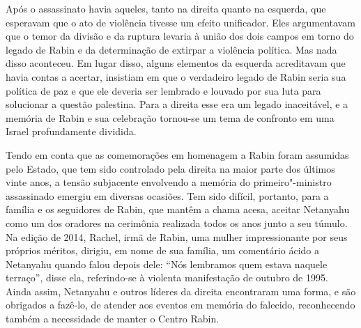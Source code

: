 Após o assassinato havia aqueles, tanto na direita quanto na esquerda,
que esperavam que o ato de violência tivesse um efeito unificador. Eles
argumentavam que o temor da divisão e da ruptura levaria à união dos dois campos
em torno do legado de Rabin e da determinação de extirpar a
violência política. Mas nada disso aconteceu. Em lugar disso, alguns
elementos da esquerda acreditavam que havia contas a acertar, insistiam
em que o verdadeiro legado de Rabin seria sua política de paz e
que ele deveria ser lembrado e louvado por sua luta para solucionar a
questão palestina. Para a direita esse era um legado inaceitável, e a
memória de Rabin e sua celebração tornou-se um tema de confronto em uma
Israel profundamente dividida.


Tendo em conta que as comemorações em homenagem a Rabin foram assumidas
pelo Estado, que tem sido controlado pela direita na maior
parte dos últimos vinte anos, a tensão subjacente envolvendo a memória
do primeiro"-ministro assassinado emergiu em diversas ocasiões. Tem sido difícil, portanto, para
a família e os seguidores de Rabin, que mantêm a chama acesa, aceitar
Netanyahu como um dos oradores na cerimônia realizada todos os anos
junto a seu túmulo. Na edição de 2014, Rachel, irmã de
Rabin, uma mulher impressionante por seus próprios méritos, dirigiu, em nome de sua família, um
comentário ácido a Netanyahu quando falou depois dele:
``Nós lembramos quem estava naquele terraço'', disse
ela, referindo-se à violenta manifestação de outubro de 1995. Ainda
assim, Netanyahu e outros líderes da direita encontraram uma forma, e são
obrigados a fazê-lo, de atender aos eventos em memória do falecido,
reconhecendo também a necessidade de manter o Centro Rabin.


